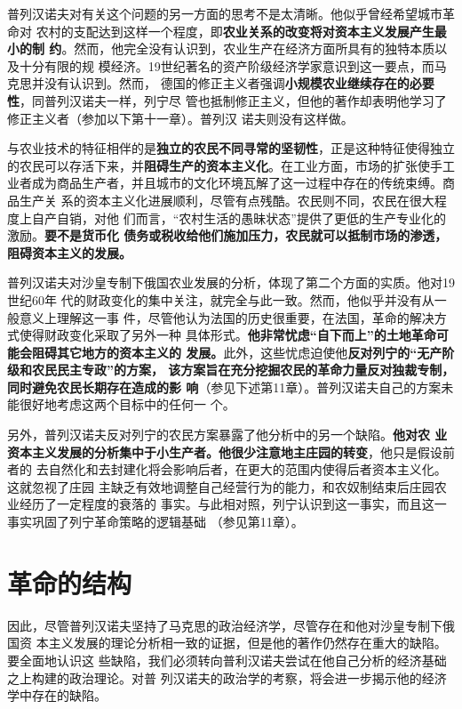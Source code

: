 普列汉诺夫对有关这个问题的另一方面的思考不是太清晰。他似乎曾经希望城市革命对
农村的支配达到这样一个程度，即\textbf{农业关系的改变将对资本主义发展产生最小的制
  约}。然而，他完全没有认识到，农业生产在经济方面所具有的独特本质以及十分有限的规
模经济。19世纪著名的资产阶级经济学家意识到这一要点，而马克思并没有认识到。然而，
德国的修正主义者强调\textbf{小规模农业继续存在的必要性}，同普列汉诺夫一样，列宁尽
管也抵制修正主义，但他的著作却表明他学习了修正主义者（参加以下第十一章）。普列汉
诺夫则没有这样做。

与农业技术的特征相伴的是\textbf{独立的农民不同寻常的坚韧性}，正是这种特征使得独立
的农民可以存活下来，并\textbf{阻碍生产的资本主义化}。在工业方面，市场的扩张使手工
业者成为商品生产者，并且城市的文化环境瓦解了这一过程中存在的传统束缚。商品生产关
系的资本主义化进展顺利，尽管有点残酷。农民则不同，农民在很大程度上自产自销，对他
们而言，“农村生活的愚昧状态”提供了更低的生产专业化的激励。\textbf{要不是货币化
  债务或税收给他们施加压力，农民就可以抵制市场的渗透，阻碍资本主义的发展。}

普列汉诺夫对沙皇专制下俄国农业发展的分析，体现了第二个方面的实质。他对19世纪60年
代的财政变化的集中关注，就完全与此一致。然而，他似乎并没有从一般意义上理解这一事
件，尽管他认为法国的历史很重要，在法国，革命的解决方式使得财政变化采取了另外一种
具体形式。\textbf{他非常忧虑“自下而上”的土地革命可能会阻碍其它地方的资本主义的
  发展。}此外，这些忧虑迫使他\textbf{反对列宁的“无产阶级和农民民主专政”的方案，
  该方案旨在充分挖掘农民的革命力量反对独裁专制，同时避免农民长期存在造成的影
  响}（参见下述第11章）。普列汉诺夫自己的方案未能很好地考虑这两个目标中的任何一
个。

另外，普列汉诺夫反对列宁的农民方案暴露了他分析中的另一个缺陷。\textbf{他对农
  业资本主义发展的分析集中于小生产者。他很少注意地主庄园的转变}，他只是假设前者的
去自然化和去封建化将会影响后者，在更大的范围内使得后者资本主义化。这就忽视了庄园
主缺乏有效地调整自己经营行为的能力，和农奴制结束后庄园农业经历了一定程度的衰落的
事实。与此相对照，列宁认识到这一事实，而且这一事实巩固了列宁革命策略的逻辑基础
（参见第11章）。

\section{革命的结构}
因此，尽管普列汉诺夫坚持了马克思的政治经济学，尽管存在和他对沙皇专制下俄国资
本主义发展的理论分析相一致的证据，但是他的著作仍然存在重大的缺陷。要全面地认识这
些缺陷，我们必须转向普利汉诺夫尝试在他自己分析的经济基础之上构建的政治理论。对普
列汉诺夫的政治学的考察，将会进一步揭示他的经济学中存在的缺陷。

